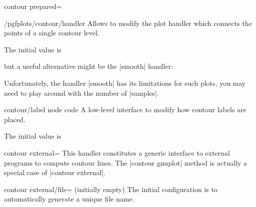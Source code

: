 {{\begin{plottype}[/pgfplots]{contour prepared=\textcolor{black}{}}
    \begin{stylekey}{/pgfplots/contour/handler}
        Allows to modify the plot handler which connects the points of a single
        contour level.

        The initial value is
\begin{codeexample}
\end{codeexample}
        but a useful alternative might be the |smooth| handler:
\pgfplotsexpensiveexample
\begin{codeexample}[]
\end{codeexample}
        Unfortunately, the \tikzname{} handler |smooth| has its limitations for
        such plots, you may need to play around with the number of |samples|.
    \end{stylekey}

    \begin{pgfplotscodekey}{contour/label node code}
        A low-level interface to modify how contour labels are placed.

        The initial value is
\begin{codeexample}
\end{codeexample}
    \end{pgfplotscodekey}
\end{plottype}

\begin{plottype}[/pgfplots]{
    contour external=\textcolor{black}{}%
}
    This handler constitutes a generic interface to external programs to
    compute contour lines. The |contour gnuplot| method is actually a special
    case of |contour external|.

    \begin{pgfplotskey}{contour external/file= (initially empty)}
        The initial configuration is to automatically generate a unique file name.
    \end{pgfplotskey}


\end{plottype}}}
